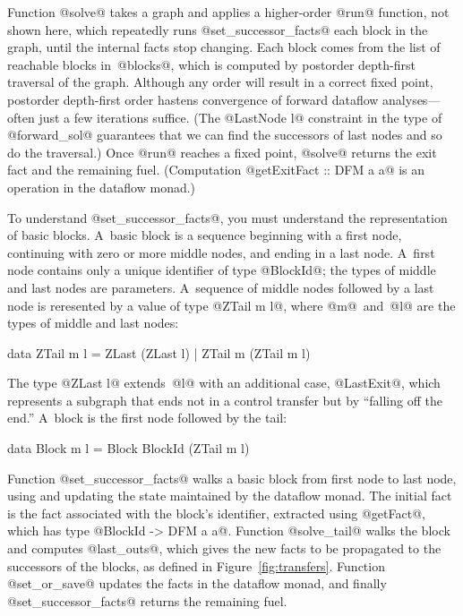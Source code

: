 \documentclass[blockstyle,preprint,nocopyrightspace]{sigplanconf}
\newcommand\figref[1]{Figure~\ref{fig:#1}}
\begin{document}
Function @solve@ takes a graph
and applies a higher-order @run@ function,
not shown here,
which repeatedly runs
@set_successor_facts@ each block in the graph, until the internal facts
stop changing.
Each block comes from  the list of reachable blocks in~@blocks@,
which is computed by postorder depth-first traversal of the graph.
Although any order will result in a correct fixed point,
postorder depth-first order hastens convergence of forward dataflow
analyses---often just a few iterations suffice.
(The @LastNode l@ constraint in the type of @forward_sol@
guarantees that we can
  find the successors of last nodes and so do the traversal.)
Once @run@ reaches a fixed point, @solve@ returns the exit fact and
the remaining fuel.
(Computation @getExitFact :: DFM a a@ is an operation in the dataflow
monad.)

To understand @set_successor_facts@, you must understand the
representation of basic blocks.
A~basic block is a sequence beginning with a first node, continuing
with zero or more middle nodes, and ending in a last node.
A~first node contains only a unique identifier of type @BlockId@; the
types of middle and last nodes are parameters.
A~sequence of middle nodes followed by a last node is reresented by a
value of type @ZTail m l@, where @m@~and~@l@
are the types of middle and last nodes:
\begin{code}
data ZTail m l = ZLast (ZLast l) | ZTail m (ZTail m l)
\end{code}
The type @ZLast l@ extends~@l@ with an additional case, @LastExit@,
which represents a subgraph that ends not in a control transfer but by
``falling off the end.''
A~block is the first node followed by the tail:
\begin{code}
data Block m l = Block BlockId (ZTail m l)
\end{code}

Function @set_successor_facts@ walks a basic block from first node to
last node, using and updating the state maintained by
the dataflow monad.
The initial fact is the fact associated with the block's identifier,
extracted using @getFact@, which has type @BlockId -> DFM a a@.
Function @solve_tail@ walks the block and computes @last_outs@, which
gives the new facts to be propagated to the successors of the blocks,
as defined in \figref{transfers}.
Function @set_or_save@ updates the facts in the dataflow monad,
and finally @set_successor_facts@ returns the remaining fuel.
\end{document}
